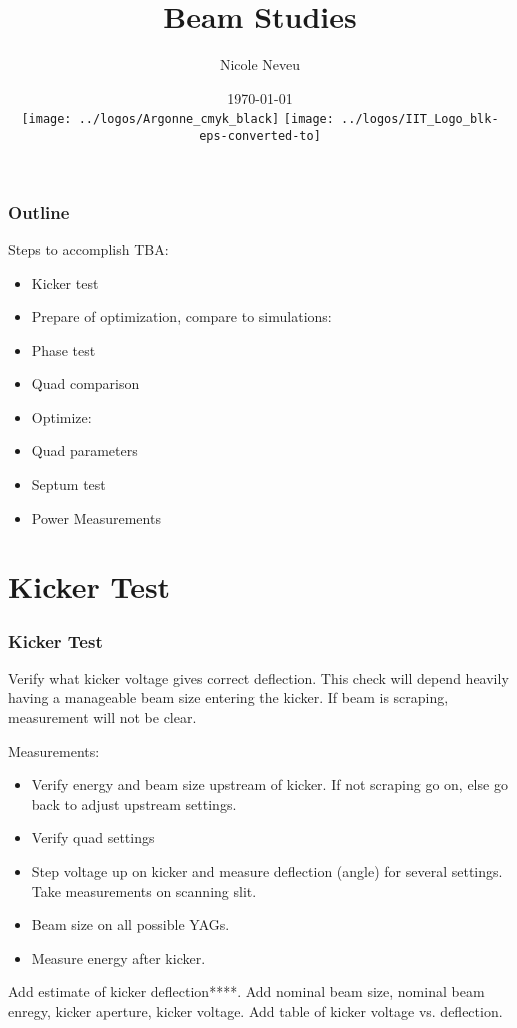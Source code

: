 \documentclass[professionalfonts,t]{beamer}
\title[May 2018]{Beam Studies}
\author[N.Neveu]{{\Large Nicole Neveu}}
\institute[ANL, IIT] %
{   Illinois Institute of Technology \\
	Argonne National Laboratory \\
    \url{nneveu@anl.gov} 
}
\date{ \today \\
\texttt{[image: ../logos/Argonne\_cmyk\_black]}%
\hfill \hfill \hfill%
\texttt{[image: ../logos/IIT\_Logo\_blk-eps-converted-to]}%
}
\begin{document}
\begin{frame}
  \titlepage
\end{frame}
\begin{frame}
	\frametitle{Outline}
	\tableofcontents
\end{frame}

\begin{frame}
	Steps to accomplish TBA:
	\vspace{1em}

		\begin{itemize}
			\item Kicker test
			\item Prepare of optimization, compare to simulations:
			\item Phase test
			\item Quad comparison
			\item Optimize:
			\item Quad parameters
			\item Septum test
			\item Power Measurements
		\end{itemize}
	
\end{frame}

\section{Kicker Test}
\begin{frame}
\frametitle{Kicker Test}
Verify what kicker voltage gives correct deflection. 
This check will depend heavily having a manageable beam size entering the kicker.
If beam is scraping, measurement will not be clear.

\vspace{0.5em}
Measurements:
\begin{itemize}
	\item Verify energy and beam size upstream of kicker. If not scraping go on, else go back to adjust upstream settings. 
	\item Verify quad settings
	\item Step voltage up on kicker and measure
	deflection (angle) for several settings.
	Take measurements on scanning slit.  
	\item Beam size on all possible YAGs. 
	\item Measure energy after kicker. 
\end{itemize}

Add estimate of kicker deflection****.
Add nominal beam size, nominal beam enregy, kicker aperture, kicker voltage.
Add table of kicker voltage vs. deflection.
\end{frame}
\end{document}
